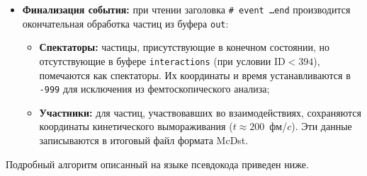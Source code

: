 \documentclass{extarticle}
\begin{document}
\begin{itemize}
                \item \textbf{Финализация события:} 
                    при чтении заголовка \texttt{\# event \ldots end} 
                    производится окончательная обработка частиц из буфера \texttt{out}:
                    \begin{itemize}
                        \item \textbf{Спектаторы:} 
                            частицы, присутствующие в конечном состоянии, 
                            но отсутствующие в буфере \texttt{interactions} 
                            (при условии $\text{ID} < 394$), помечаются как спектаторы. 
                            Их координаты и время устанавливаются в \texttt{-999} 
                            для исключения из фемтоскопического анализа;
                        \item \textbf{Участники:} 
                            для частиц, участвовавших во взаимодействиях, сохраняются 
                            координаты кинетического вымораживания ($t \approx 200$~фм/$c$). 
                            Эти данные записываются в итоговый файл формата McDst.
                    \end{itemize}
            \end{itemize}

            Подробный алгоритм описанный на языке псевдокода приведен ниже.
\end{document}
